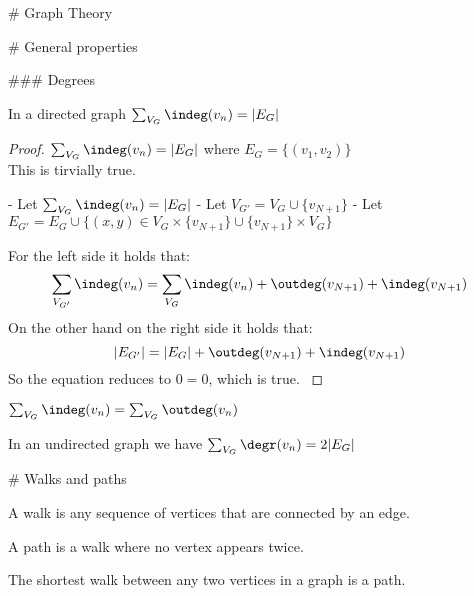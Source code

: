 # Graph Theory

# General properties

### Degrees

\begin{theorem} \label{sumIndegreesIsNrEdges}
    In a directed graph $\sum_{V_G} \indeg(v_n) = |E_G|$
\end{theorem}

\begin{proof}
    {$\sum_{V_G} \indeg(v_n) = |E_G|$ where $E_G = \{(v_1, v_2)\}$ \\}
    {This is tirvially true.}
    {
    
        - Let $\sum_{V_G} \indeg(v_n) = |E_G|$ 
        - Let $V_{G'} = V_G \cup \{v_{N+1}\}$
        - Let $E_{G'} = E_G \cup \{(x, y) \in V_G \times \{v_{N+1}\} \cup \{v_{N+1}\} \times V_G \}$
    
    }
    {
     For the left side it holds that: 
                $$ \sum_{V_{G'}} \indeg(v_n) = \sum_{V_G} \indeg(v_n) + \outdeg(v_{N+1}) + \indeg(v_{N+1}) $$
                On the other hand on the right side it holds that: 
                $$ |E_{G'}| = |E_G| + \outdeg(v_{N+1}) + \indeg(v_{N+1}) $$
                So the equation reduces to $0=0$, which is true.
    }
\end{proof}


\begin{lemma} \label{indegIsOutdeg}
    $\sum_{V_G} \indeg(v_n) = \sum_{V_G} \outdeg(v_n)$
\end{lemma}

\begin{lemma}
    In an undirected graph we have $\sum_{V_G} \degr(v_n) = 2|E_G|$
\end{lemma}

# Walks and paths

\begin{definition}
    A walk is any sequence of vertices that are connected by an edge.
\end{definition}

\begin{definition}
    A path is a walk where no vertex appears twice.
\end{definition}

\begin{theorem}
    The shortest walk between any two vertices in a graph is a path.
\end{theorem}

